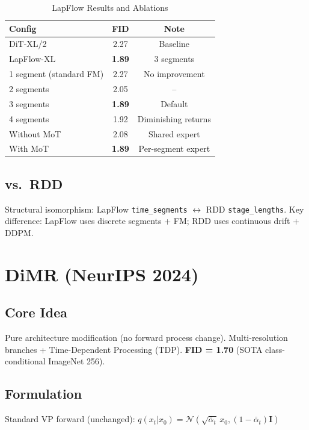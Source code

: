 \documentclass[11pt, a4paper]{article}
\newcommand{\alphabar}{\bar{\alpha}}
\begin{document}
\begin{table}[H]
\centering
\caption{LapFlow Results and Ablations}
\begin{tabular}{lcc}
\toprule
Config & FID & Note \\
\midrule
DiT-XL/2 & 2.27 & Baseline \\
LapFlow-XL & \textbf{1.89} & 3 segments \\
\midrule
1 segment (standard FM) & 2.27 & No improvement \\
2 segments & 2.05 & -- \\
3 segments & \textbf{1.89} & Default \\
4 segments & 1.92 & Diminishing returns \\
\midrule
Without MoT & 2.08 & Shared expert \\
With MoT & \textbf{1.89} & Per-segment expert \\
\bottomrule
\end{tabular}
\end{table}

\subsection{vs.\ RDD}

Structural isomorphism: LapFlow \texttt{time\_segments} $\leftrightarrow$ RDD \texttt{stage\_lengths}. Key difference: LapFlow uses discrete segments + FM; RDD uses continuous drift + DDPM.

\newpage
\section{DiMR (NeurIPS 2024)}

\subsection{Core Idea}
Pure architecture modification (no forward process change). Multi-resolution branches + Time-Dependent Processing (TDP). \textbf{FID = 1.70} (SOTA class-conditional ImageNet 256).

\subsection{Formulation}

Standard VP forward (unchanged):
$q(x_t|x_0) = \mathcal{N}(\sqrt{\alphabar_t}\,x_0, (1-\alphabar_t)\mathbf{I})$
\end{document}
